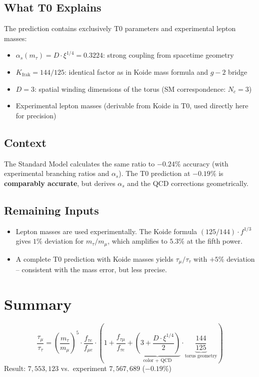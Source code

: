 	\subsection{What T0 Explains}
	
	The prediction contains exclusively T0 parameters and experimental lepton masses:
	\begin{itemize}
		\item $\alpha_s(m_\tau) = D \cdot \xi^{1/4} = 0.3224$: strong coupling from spacetime geometry
		\item $K_\text{frak} = 144/125$: identical factor as in Koide mass formula and $g-2$ bridge
		\item $D = 3$: spatial winding dimensions of the torus (SM correspondence: $N_c=3$)
		\item Experimental lepton masses (derivable from Koide in T0, used directly here for precision)
	\end{itemize}
	
	\subsection{Context}
	
	The Standard Model calculates the same ratio to $-0.24\%$ accuracy (with experimental branching ratios and $\alpha_s$). The T0 prediction at $-0.19\%$ is \textbf{comparably accurate}, but derives $\alpha_s$ and the QCD corrections geometrically.
	
	\subsection{Remaining Inputs}
	
	\begin{itemize}
		\item Lepton masses are used experimentally. The Koide formula $(125/144) \cdot f^{1/3}$ gives $1\%$ deviation for $m_\tau/m_\mu$, which amplifies to $5.3\%$ at the fifth power.
		\item A complete T0 prediction with Koide masses yields $\tau_\mu/\tau_\tau$ with $+5\%$ deviation -- consistent with the mass error, but less precise.
	\end{itemize}
	
	
	\section{Summary}
	
	\begin{keypoint}
		\begin{equation}
			\frac{\tau_\mu}{\tau_\tau} = \left(\frac{m_\tau}{m_\mu}\right)^5 \cdot \frac{f_{\tau e}}{f_{\mu e}} \cdot \left(1 + \frac{f_{\tau\mu}}{f_{\tau e}} + \underbrace{\left(3 + \frac{D \cdot \xi^{1/4}}{2}\right)}_{\text{color + QCD}} \cdot \underbrace{\frac{144}{125}}_{\text{torus geometry}}\right)
		\end{equation}
		Result: $7{,}553{,}123$ vs.\ experiment $7{,}567{,}689$ (\textbf{$-0.19\%$})
	\end{keypoint}
	
